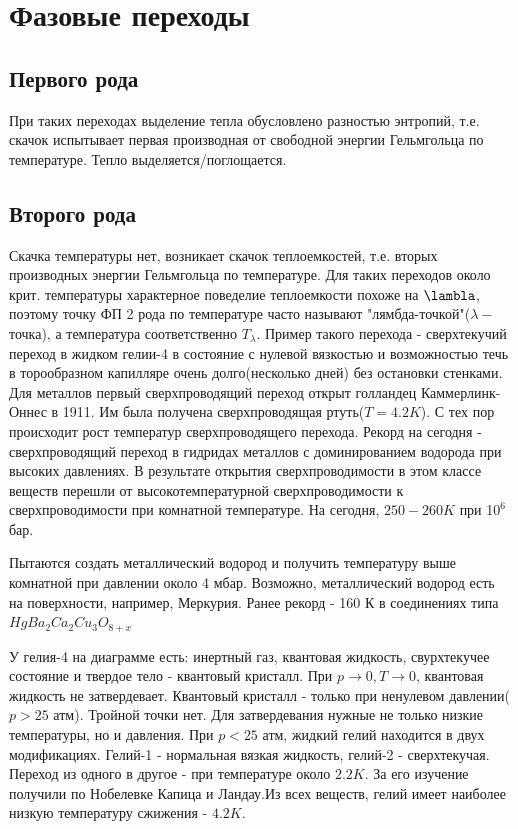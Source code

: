 \documentclass{article}
\begin{document}
\section{Фазовые переходы}
\subsection{Первого рода}
При таких переходах выделение тепла обусловлено разностью энтропий, т.е. скачок испытывает первая производная от свободной энергии Гельмгольца по температуре. Тепло выделяется/поглощается.
\subsection{Второго рода}
Скачка температуры нет, возникает скачок теплоемкостей, т.е. вторых производных энергии Гельмгольца по температуре. Для таких переходов около крит. температуры характерное поведелие теплоемкости похоже на $\lambla$, поэтому точку ФП 2 рода по температуре часто называют "лямбда-точкой"($\lambda-$точка), а температура соответственно $T_{\lambda}$. Пример такого перехода - сверхтекучий переход в жидком гелии-4 в состояние с нулевой вязкостью и возможностью течь в торообразном капилляре очень долго(несколько дней) без остановки стенками. Для металлов первый сверхпроводящий переход открыт голландец Каммерлинк-Оннес в 1911. Им была получена сверхпроводящая ртуть($T=4.2K$). С тех пор происходит рост температур сверхпроводящего перехода. Рекорд на сегодня - сверхпроводящий переход в гидридах металлов с доминированием водорода при высоких давлениях. В результате открытия сверхпроводимости в этом классе веществ перешли от высокотемпературной сверхпроводимости к сверхпроводимости при комнатной температуре. На сегодня, $250-260 K$ при 1$0^6$ бар. 

Пытаются создать металлический водород и получить температуру выше комнатной при давлении около 4 мбар. Возможно, металлический водород есть на поверхности, например, Меркурия. Ранее рекорд - 160 К в соединениях типа $HgBa_2Ca_2Cu_3 O_{8+x}$

У гелия-4 на диаграмме есть: инертный газ, квантовая жидкость, свурхтекучее состояние и твердое тело - квантовый кристалл. При $p \to 0, T \to 0$, квантовая жидкость не затвердевает. Квантовый кристалл - только при ненулевом давлении($p>25$ атм). Тройной точки нет. Для затвердевания нужные не только низкие температуры, но и давления. При $p<25$ атм, жидкий гелий находится в двух модификациях. Гелий-1 - нормальная вязкая жидкость, гелий-2 - сверхтекучая. Переход из одного в другое - при температуре около $2.2 K$. За его изучение получили по Нобелевке Капица и Ландау.Из всех веществ, гелий имеет наиболее низкую температуру сжижения - $4.2 K$.
\end{document}
